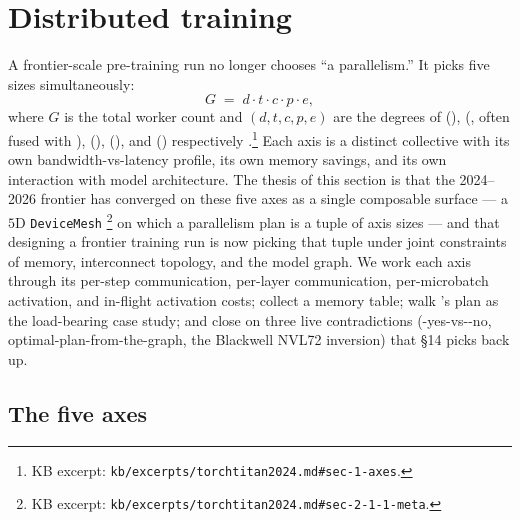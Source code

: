 
\section{Distributed training}
\label{sec:distributed-training}

A frontier-scale pre-training run no longer chooses ``a parallelism.''
It picks five sizes simultaneously:
\begin{equation}
G \;=\; d \cdot t \cdot c \cdot p \cdot e,
\label{eq:5d-mesh}
\end{equation}
where $G$ is the total worker count and $(d, t, c, p, e)$ are the
degrees of \emph{} (), \emph{} (, often
fused with ), \emph{} (),
\emph{} (), and \emph{} ()
respectively \citep[\S 1]{torchtitan2024}.\footnote{KB excerpt:
\texttt{kb/excerpts/torchtitan2024.md\#sec-1-axes}.} Each axis is a
distinct collective with its own bandwidth-vs-latency profile, its own
memory savings, and its own interaction with model architecture. The
thesis of this section is that the 2024--2026 frontier has converged
on these five axes as a single composable surface --- a $5$D
\texttt{DeviceMesh} \citep[\S 2.1.1]{torchtitan2024}\footnote{KB
excerpt: \texttt{kb/excerpts/torchtitan2024.md\#sec-2-1-1-meta}.} on
which a parallelism plan is a tuple of axis sizes --- and that
designing a frontier training run is now picking that tuple under
joint constraints of memory, interconnect topology, and the model
graph. We work each axis through its per-step communication, per-layer
communication, per-microbatch activation, and in-flight activation
costs; collect a memory table; walk 's plan as the
load-bearing case study; and close on three live contradictions
(-yes-vs--no, optimal-plan-from-the-graph, the Blackwell NVL72
inversion) that §14 picks back up.

\subsection{The five axes}
\label{sec:dt-axes}

